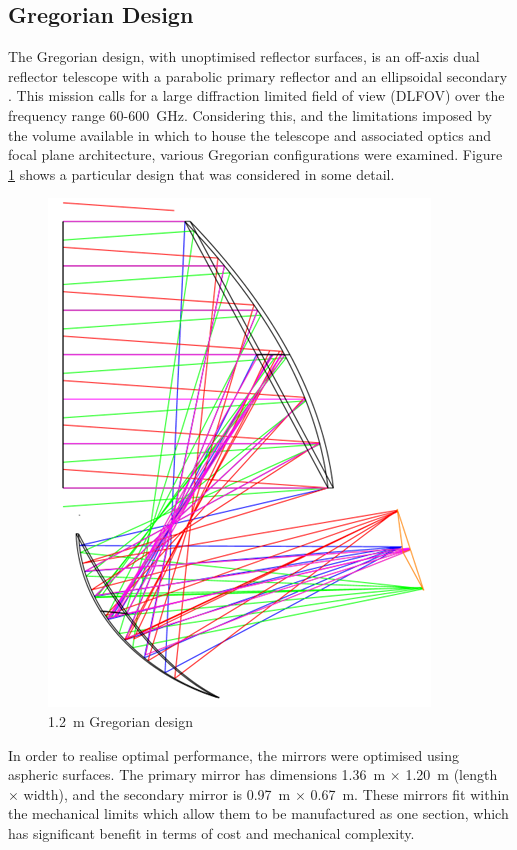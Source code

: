 \documentclass[11pt,a4paper]{article}
\begin{document}
\subsection{Gregorian Design}
The Gregorian design, with unoptimised reflector surfaces, is an off-axis dual reflector telescope with a parabolic primary reflector and an ellipsoidal secondary \cite{granet_2002}. This mission calls for a large diffraction limited field of view (DLFOV) over the frequency range 60-600~GHz. Considering this, and the limitations imposed by the volume available in which to house the telescope and associated optics and focal plane architecture, various Gregorian configurations were examined. Figure \ref{fig:gregschem} shows a particular design that was considered in some detail. 
\begin{figure}[htbp]
	\centering
	\includegraphics[scale=0.5]{core_greg_nolens.png}
	\caption{1.2~m Gregorian design}
	\label{fig:gregschem}
\end{figure}
In order to realise optimal performance, the mirrors were optimised using aspheric surfaces. The primary mirror has dimensions 1.36~m $\times$ 1.20~m (length $\times$ width), and the secondary mirror is 0.97~m $\times$ 0.67~m. These mirrors fit within the mechanical limits which allow them to be manufactured as one section, which has significant benefit in terms of cost and mechanical complexity.
\end{document}
